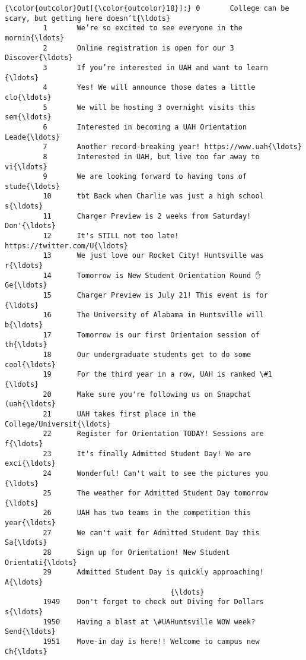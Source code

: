 \documentclass[11pt]{article}
\begin{document}
\begin{Verbatim}[commandchars=\\\{\}]
{\color{outcolor}Out[{\color{outcolor}18}]:} 0       College can be scary, but getting here doesn’t{\ldots}
         1       We’re so excited to see everyone in the mornin{\ldots}
         2       Online registration is open for our 3 Discover{\ldots}
         3       If you’re interested in UAH and want to learn {\ldots}
         4       Yes! We will announce those dates a little clo{\ldots}
         5       We will be hosting 3 overnight visits this sem{\ldots}
         6       Interested in becoming a UAH Orientation Leade{\ldots}
         7       Another record-breaking year! https://www.uah{\ldots}
         8       Interested in UAH, but live too far away to vi{\ldots}
         9       We are looking forward to having tons of stude{\ldots}
         10      tbt Back when Charlie was just a high school s{\ldots}
         11      Charger Preview is 2 weeks from Saturday! Don'{\ldots}
         12      It's STILL not too late! https://twitter.com/U{\ldots}
         13      We just love our Rocket City! Huntsville was r{\ldots}
         14      Tomorrow is New Student Orientation Round ✋ Ge{\ldots}
         15      Charger Preview is July 21! This event is for {\ldots}
         16      The University of Alabama in Huntsville will b{\ldots}
         17      Tomorrow is our first Orientaion session of th{\ldots}
         18      Our undergraduate students get to do some cool{\ldots}
         19      For the third year in a row, UAH is ranked \#1 {\ldots}
         20      Make sure you're following us on Snapchat (uah{\ldots}
         21      UAH takes first place in the College/Universit{\ldots}
         22      Register for Orientation TODAY! Sessions are f{\ldots}
         23      It's finally Admitted Student Day! We are exci{\ldots}
         24      Wonderful! Can't wait to see the pictures you {\ldots}
         25      The weather for Admitted Student Day tomorrow {\ldots}
         26      UAH has two teams in the competition this year{\ldots}
         27      We can't wait for Admitted Student Day this Sa{\ldots}
         28      Sign up for Orientation! New Student Orientati{\ldots}
         29      Admitted Student Day is quickly approaching! A{\ldots}
                                       {\ldots}                        
         1949    Don't forget to check out Diving for Dollars s{\ldots}
         1950    Having a blast at \#UAHuntsville WOW week? Send{\ldots}
         1951    Move-in day is here!! Welcome to campus new Ch{\ldots}

\end{Verbatim}
\end{document}
